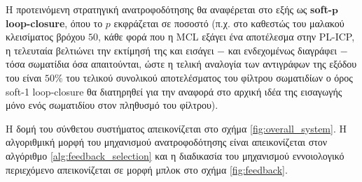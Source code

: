 Η προτεινόμενη στρατηγική ανατροφοδότησης θα αναφέρεται στο εξής ως
\textbf{soft-}$\bm{p}$ \textbf{loop-closure}, όπου το $p$ εκφράζεται σε ποσοστό
(π.χ. στο καθεστώς του μαλακού κλεισίματος βρόχου $50$, κάθε φορά που η MCL εξάγει ένα
αποτέλεσμα στην PL-ICP, η τελευταία βελτιώνει την εκτίμησή της και εισάγει $-$ και
ενδεχομένως διαγράφει $-$ τόσα σωματίδια όσα απαιτούνται, ώστε η τελική αναλογία
των αντιγράφων της εξόδου του είναι $50\%$ του τελικού συνολικού αποτελέσματος του φίλτρου σωματιδίων
ο όρος soft-1 loop-closure θα διατηρηθεί για την αναφορά στο
αρχική ιδέα της εισαγωγής μόνο ενός σωματιδίου στον πληθυσμό του φίλτρου).

Η δομή του σύνθετου συστήματος απεικονίζεται στο σχήμα
\ref{fig:overall_system}. Η αλγοριθμική μορφή του μηχανισμού ανατροφοδότησης είναι
απεικονίζεται στον αλγόριθμο \ref{alg:feedback_selection} και η διαδικασία του μηχανισμού
εννοιολογικό περιεχόμενο απεικονίζεται σε μορφή μπλοκ στο σχήμα \ref{fig:feedback}.

